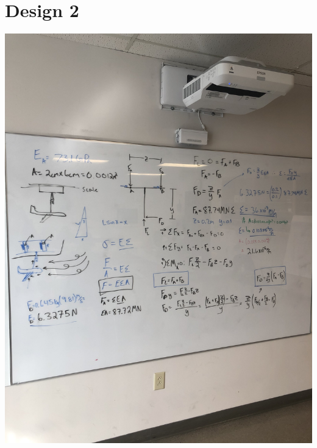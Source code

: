\documentclass[12pt, letterpaper]{article}
\begin{document}
	\section{Design 2}
		\includegraphics[width = \textwidth]{IMG_6614.jpg}
\end{document}
